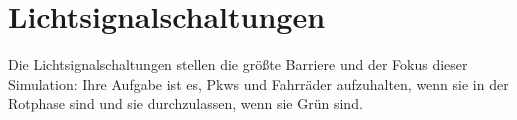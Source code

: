 %

\section{Lichtsignalschaltungen}\label{sec:lightsignals}

Die Lichtsignalschaltungen stellen die größte Barriere und der Fokus dieser Simulation: Ihre Aufgabe ist es, Pkws und Fahrräder aufzuhalten, wenn sie in der Rotphase sind und sie durchzulassen, wenn sie Grün sind.






